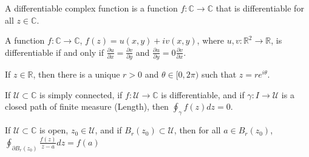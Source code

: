 \documentclass[crop=false,class=book]{standalone}
\begin{document}
\begin{definition}
A differentiable complex function is a function $f:\mathbb{C}\rightarrow\mathbb{C}$ that is differentiable for all $z\in\mathbb{C}$.
\end{definition}
\begin{theorem}
A function $f:\mathbb{C}\rightarrow\mathbb{C}$, $f(z)=u(x,y)+iv(x,y)$, where $u,v:\mathbb{R}^{2}\rightarrow \mathbb{R}$, is differentiable if and only if $\frac{\partial u}{\partial x}=\frac{\partial v}{\partial y}$ and $\frac{\partial u}{\partial y} = 0\frac{\partial v}{\partial x}$.
\end{theorem}
\begin{theorem}
If $z\in\mathbb{R}$, then there is a unique $r>0$ and $\theta\in[0,2\pi)$ such that $z=re^{i\theta}$.
\end{theorem}
\begin{theorem}
If $\mathcal{U}\subset\mathbb{C}$ is simply connected, if $f:\mathcal{U}\rightarrow \mathbb{C}$ is differentiable, and if $\gamma:I\rightarrow \mathcal{U}$ is a closed path of finite measure (Length), then $\oint_{\gamma}f(z)dz = 0$.
\end{theorem}
\begin{theorem}
If $\mathcal{U}\subset\mathbb{C}$ is open, $z_{0}\in\mathcal{U}$, and if $B_{r}(z_{0})\subset\mathcal{U}$, then for all $a\in B_{r}(z_{0})$, $\oint_{\partial B_{r}(z_{0})}\frac{f(z)}{z-a}dz = f(a)$
\end{theorem}
\end{document}
